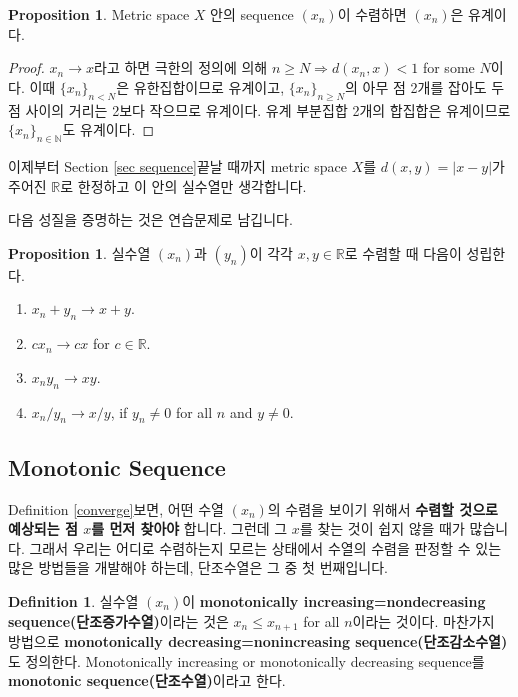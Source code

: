 \documentclass[12pt]{article}
\theoremstyle{definition}
\newtheorem{prop}[thm]{Proposition}
\newtheorem{defn}[thm]{Definition}
\def\NN{\mathbb{N}}
\def\RR{\mathbb{R}}
\newcommand{\abs}[1]{\left\vert#1\right\vert}
\begin{document}
	\begin{prop} \label{conv bdd}
		Metric space \(X\) 안의 sequence \((x_n)\)이 수렴하면 \((x_n)\)은 유계이다.
	\end{prop}
	\begin{proof}
		\(x_n \rightarrow x\)라고 하면 극한의 정의에 의해 \(n \ge N \Rightarrow d(x_n, x) < 1\) for some \(N\)이다. 이때 \(\{x_n\}_{n < N}\)은 유한집합이므로 유계이고, \(\{x_n\}_{n \ge N}\)의 아무 점 2개를 잡아도 두 점 사이의 거리는 2보다 작으므로 유계이다. 유계 부분집합 2개의 합집합은 유계이므로 \(\{x_n\}_{n \in \NN}\)도 유계이다.
	\end{proof}

이제부터 Section \ref{sec sequence}\가 끝날 때까지 metric space \(X\)를 \(d(x, y) = \abs{x - y}\)가 주어진 \(\RR\)로 한정하고 이 안의 실수열만 생각합니다.

다음 성질을 증명하는 것은 연습문제로 남깁니다.

	\begin{prop}
		실수열 \((x_n)\)과 \((y_n)\)이 각각 \(x, y \in \RR\)로 수렴할 때 다음이 성립한다.
		\begin{enumerate} [label=(\alph*), leftmargin=2\parindent]
			\item
			\(x_n + y_n \rightarrow x + y\).
			\item
			\(cx_n \rightarrow cx\) for \(c \in \RR\).
			\item
			\(x_ny_n \rightarrow xy\).
			\item
			\(x_n/y_n \rightarrow x/y\), if \(y_n \neq 0\) for all \(n\) and \(y \neq 0\).
		\end{enumerate}
	\end{prop}

\subsection{Monotonic Sequence}

Definition \ref{converge}\를 보면, 어떤 수열 \((x_n)\)의 수렴을 보이기 위해서 \textbf{수렴할 것으로 예상되는 점 \(x\)를 먼저 찾아야} 합니다. 그런데 그 \(x\)를 찾는 것이 쉽지 않을 때가 많습니다. 그래서 우리는 어디로 수렴하는지 모르는 상태에서 수열의 수렴을 판정할 수 있는 많은 방법들을 개발해야 하는데, 단조수열은 그 중 첫 번째입니다.

	\begin{defn}
		실수열 \((x_n)\)이 \textbf{monotonically increasing=nondecreasing sequence(단조증가수열)}이라는 것은 \(x_n \le x_{n+1}\) for all \(n\)이라는 것이다. 마찬가지 방법으로 \textbf{monotonically decreasing=nonincreasing sequence(단조감소수열)}도 정의한다. Monotonically increasing or monotonically decreasing sequence를 \textbf{monotonic sequence(단조수열)}이라고 한다.
	\end{defn}
\end{document}
